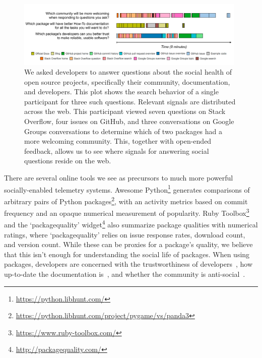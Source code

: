 \begin{figure}
\centering
\includegraphics[width=0.98\textwidth]{figures/visits}
\caption{%
We asked developers to answer questions about the social health of open source projects,
specifically their community, documentation, and developers.
This plot shows the search behavior of a single participant for three such questions.
Relevant signals are distributed across the web.
This participant viewed seven questions on Stack Overflow, four issues on GitHub, and three conversations on Google Groups conversations to determine which of two packages had a more welcoming community.
This, together with open-ended feedback, allows us to see where signals for answering social questions reside on the web.
}
\label{fig:visits}
\end{figure}

There are several online tools we see as precursors to much more powerful socially-enabled telemetry systems.
Awesome Python\footnote{\url{https://python.libhunt.com/}} generates comparisons of arbitrary pairs of Python packages\footnote{\url{https://python.libhunt.com/project/pygame/vs/panda3}}, with an activity metrics based on commit frequency and an opaque numerical measurement of popularity.
Ruby Toolbox\footnote{\url{https://www.ruby-toolbox.com/}} and the `packagequality' widget\footnote{\url{http://packagequality.com/}} also summarize package qualities with numerical ratings, where `packagequality' relies on issue response rates, download count, and version count.
While these can be proxies for a package's quality, we believe that this isn't enough for understanding the social life of packages.
When using packages, developers are concerned with the trustworthiness of developers~\cite{robillard_field_2011}, how up-to-date the documentation is~\cite{storey_revolution_2014,nykaza_what_2002,lethbridge_how_2003,robillard_field_2011}, and whether the community is anti-social~\cite{storey_revolution_2014}.

